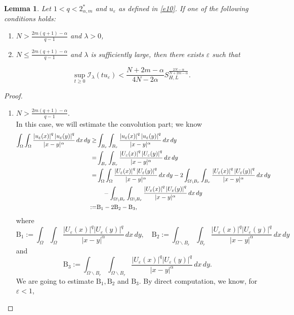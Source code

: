 \documentclass[reqno]{amsart}
\newtheorem{lemma}[theorem]{Lemma}
\newcommand{\la} {\lambda}
\newcommand{\eps}{\varepsilon}
\newcommand{\Om}{\Omega}
\newcommand{\al} {\alpha}
\newcommand{\mc} {\mathcal}
\numberwithin{theorem}{section} \numberwithin{equation}{section}
\begin{document}
\begin{lemma} \label{l9}
Let $1<q<2_{\al,m}^*$ and $u_{\eps}$ as defined in \eqref{e10}. If one of the following conditions holds:
\begin{enumerate}
\item $N>\frac{2m(q+1)-\al}{q-1}$ and $\la>0$,
\item $N \leq \frac{2m(q+1)-\al}{q-1}$ and $\la$ is sufficiently large,
then there exists $\eps$ such that 
\end{enumerate}
\[\sup _{t \geq 0} \mc{I_\la}\left(t u_{\eps}\right)<\frac{N+2m-\al}{4 N-2\al} S_{H, L}^{\frac{2N-\al}{N+2m-\al}}.\]
\end{lemma}
\begin{proof}\begin{enumerate}
\item $N>\frac{2m(q+1)-\al}{q-1}$.\\
In this case, we will estimate the convolution part; we know
 \begin{align}\label{e14}
\int_{\Om} \int_{\Om} \frac{\left|u_{\eps}(x)\right|^q\left|u_{\eps}(y)\right|^q}{|x-y|^\al} \, dx \, dy \geq & \int_{B_r} \int_{B_r} \frac{\left|u_{\eps}(x)\right|^q\left|u_{\eps}(y)\right|^q}{|x-y|^\al} \, dx \, dy \notag\\
= & \int_{B_r} \int_{B_r} \frac{\left|U_{\eps}(x)\right|^q\left|U_{\eps}(y)\right|^q}{|x-y|^\al} \, dx \, dy \notag\\
= & \int_{\Om} \int_{\Om} \frac{\left|U_{\eps}(x)\right|^q\left|U_{\eps}(y)\right|^q}{|x-y|^\al} \, dx \, dy-2 \int_{\Om \backslash B_r}\int_{B_r} \frac{\left|U_{\eps}(x)\right|^q\left|U_{\eps}(y)\right|^q}{|x-y|^\al} \, dx \, dy \notag\\
& \quad-\int_{\Om \backslash B_r}\int_{\Om \backslash B_r} \frac{\left|U_{\eps}(x)\right|^q\left|U_{\eps}(y)\right|^q}{|x-y|^\al} \, dx \, dy \\
:= & \mathrm{B_1}-2 \mathrm{B_2}-\mathrm{B_3},\notag
\end{align}
where
\[\mathrm{B_1}:=\int_{\Om} \int_{\Om} \frac{\left|U_{\eps}(x)\right|^q\left|U_{\eps}(y)\right|^q}{|x-y|^\al} \, dx \, dy, \quad \mathrm{B_2}:=\int_{\Om \backslash B_r} \int_{B_r}\frac{\left|U_{\eps}(x)\right|^q\left|U_{\eps}(y)\right|^q}{|x-y|^\al}\, dx \, dy\]
and
\[\mathrm{B_3}:=\int_{\Om \backslash B_r}\int_{\Om \backslash B_r} \frac{\left|U_{\eps}(x)\right|^q\left|U_{\eps}(y)\right|^q}{|x-y|^\al} \, dx \, dy .\]
We are going to estimate $\mathrm{B_1}, \mathrm{B_2}$ and $\mathrm{B_3}$. By direct computation, we know, for $\eps<1$,


\end{enumerate}
\end{proof}
\end{document}

